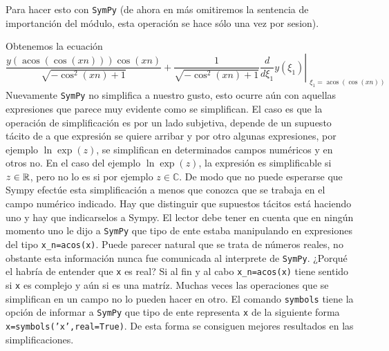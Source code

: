 Para hacer esto con \texttt{SymPy} (de ahora en más omitiremos la sentencia de importanción del módulo, esta operación se hace sólo una vez por sesion).

Obtenemos la ecuación
\[\frac{y{\left (\operatorname{acos}{\left (\cos{\left (xn \right )} \right )} \right )} \cos{\left (xn \right )}}{\sqrt{- \cos^{2}{\left (xn \right )} + 1}}
+ \frac{1}{\sqrt{- \cos^{2}{\left (xn \right )} + 1}} \left. \frac{d}{d \xi_{1
}} y{\left (\xi_{1} \right )} \right|_{\substack{ \xi_{1}=\operatorname{acos}{
\left (\cos{\left (xn \right )} \right )} }}\]
Nuevamente \texttt{SymPy} no simplifica a nuestro gusto, esto ocurre aún con aquellas expresiones que parece muy evidente como se simplifican. El caso es que la operación de simplificación es por un lado  subjetiva, depende de un supuesto tácito de a que expresión se quiere arribar y por otro algunas expresiones, por ejemplo $\ln\exp(z)$, se simplifican en determinados campos numéricos y en otros no. En el caso del ejemplo $\ln\exp(z)$, la expresión es simplificable si $z\in\mathbb{R}$, pero no lo es si por ejemplo $z\in\mathbb{C}$. De modo que no puede esperarse que Sympy efectúe esta simplificación a menos que conozca que se trabaja en el campo numérico indicado. Hay que distinguir que supuestos tácitos está haciendo uno y hay que indicarselos a Sympy.    El lector debe tener en cuenta que en ningún momento uno le dijo a \texttt{SymPy} que tipo de ente estaba manipulando en expresiones del tipo \texttt{x\_n=acos(x)}. Puede parecer natural que se trata de números reales, no obstante esta 
información nunca fue comunicada al interprete de \texttt{SymPy}. ¿Porqué el habría de entender que \texttt{x} es real? Si al fin y al cabo \texttt{x\_n=acos(x)} tiene sentido si \texttt{x} es complejo y aún si es una matríz. Muchas veces las operaciones que se simplifican en un campo no lo pueden hacer en otro. El comando  \texttt{symbols} tiene la opción de informar a \texttt{SymPy} que tipo de ente representa \texttt{x} de la siguiente forma
\texttt{x=symbols('x',real=True)}. De esta forma se consiguen mejores resultados en las simplificaciones.


